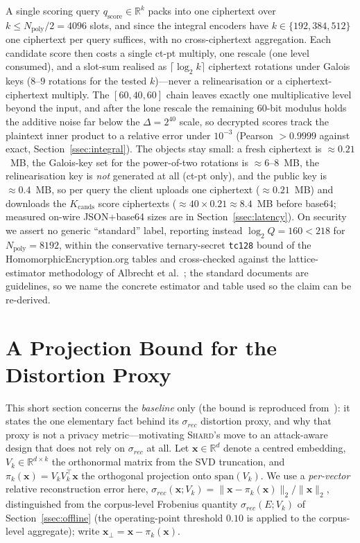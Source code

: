 A single scoring query $q_{\mathrm{score}} \in \mathbb{R}^{k}$ packs into one ciphertext over
$k \leq N_{\mathrm{poly}}/2 = 4096$ slots, and since the integral encoders have
$k \in \{192,384,512\}$ one ciphertext per query suffices, with no
cross-ciphertext aggregation. Each candidate score then costs a single ct-pt
multiply, one rescale (one level consumed), and a slot-sum realised as
$\lceil \log_2 k \rceil$ ciphertext rotations under Galois keys ($8$--$9$
rotations for the tested $k$)---never a relinearisation or a
ciphertext-ciphertext multiply. The $[60,40,60]$ chain leaves exactly one
multiplicative level beyond the input, and after the lone rescale the
remaining $60$-bit modulus holds the additive noise far below the
$\Delta = 2^{40}$ scale, so decrypted scores track the plaintext inner product
to a relative error under $10^{-3}$ (Pearson $>0.9999$ against exact,
Section~\ref{ssec:integral}). The objects stay small: a fresh ciphertext is
$\approx 0.21$~MB, the Galois-key set for the power-of-two rotations is
$\approx 6$--$8$~MB, the relinearisation key is \emph{not} generated at all
(ct-pt only), and the public key is $\approx 0.4$~MB, so per query the client
uploads one ciphertext ($\approx 0.21$~MB) and downloads the
$K_{\mathrm{cands}}$ score ciphertexts ($\approx 40 \times 0.21 \approx 8.4$~MB
before base64; measured on-wire JSON+base64 sizes are in
Section~\ref{ssec:latency}). On security we assert no generic ``standard''
label, reporting instead $\log_2 Q = 160 < 218$ for $N_{\mathrm{poly}}=8192$,
within the conservative ternary-secret \texttt{tc128} bound of the
HomomorphicEncryption.org tables \cite{ref_he_std} and cross-checked against
the lattice-estimator methodology of Albrecht et al.\
\cite{ref_lwe_estimator}; the standard documents are guidelines, so we name the
concrete estimator and table used so the claim can be re-derived.

\section{A Projection Bound for the Distortion Proxy}\label{sec:lemma}

This short section concerns the \emph{baseline} only (the bound is
reproduced from~\cite{ref_alpha}): it states the one elementary fact behind
its $\sigma_{rec}$ distortion proxy, and why that proxy is not a privacy
metric---motivating \textsc{Shard}'s move to an
attack-aware design that does not rely on $\sigma_{rec}$ at all. Let
$\mathbf{x} \in \mathbb{R}^d$ denote a centred embedding,
$V_k \in \mathbb{R}^{d \times k}$ the orthonormal matrix from the SVD
truncation, and $\pi_k(\mathbf{x}) = V_k V_k^\top \mathbf{x}$ the
orthogonal projection onto $\mathrm{span}(V_k)$. We use a \emph{per-vector}
relative reconstruction error here,
$\sigma_{rec}(\mathbf{x}; V_k) =
\| \mathbf{x} - \pi_k(\mathbf{x}) \|_2 / \|\mathbf{x}\|_2$,
distinguished from the corpus-level Frobenius quantity
$\sigma_{rec}(E;V_k)$ of Section~\ref{ssec:offline} (the operating-point
threshold $0.10$ is applied to the corpus-level aggregate); write
$\mathbf{x}_\perp = \mathbf{x} - \pi_k(\mathbf{x})$.


